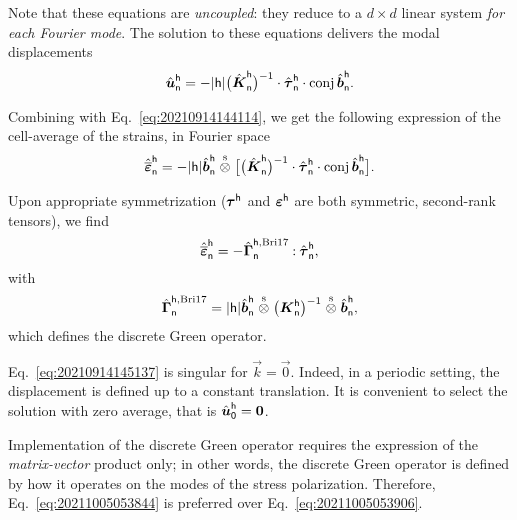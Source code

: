 Note that these equations are \emph{uncoupled}: they reduce to a \(d\times d\)
linear system \emph{for each Fourier mode}. The solution to these equations
delivers the modal displacements
\begin{equation}
  \hat{\boldsymbol u}_\mathsf{n}^\mathsf{h}=-\lvert\mathsf{h}\rvert\bigl(
  \hat{\boldsymbol K}_\mathsf{n}^\mathsf{h}\bigr)^{-1}\cdot
  \hat{\boldsymbol\tau}_\mathsf{n}^\mathsf{h}\cdot\operatorname{conj}\hat{\boldsymbol b}_\mathsf{n}^\mathsf{h}.
\end{equation}

Combining with Eq.~\eqref{eq:20210914144114}, we get the following expression of
the cell-average of the strains, in Fourier space
\begin{equation}
  \label{eq:20211005053844}
  \hat{\overline{\boldsymbol\varepsilon}}_\mathsf{n}^\mathsf{h}=-\lvert\mathsf{h}\rvert
  \hat{\boldsymbol b}_\mathsf{n}^\mathsf{h}\stackrel{\mathrm{s}}{\otimes}\bigl[\bigl(
  \hat{\boldsymbol K}_\mathsf{n}^\mathsf{h}\bigr)^{-1}\cdot
  \hat{\boldsymbol\tau}_\mathsf{n}^\mathsf{h}\cdot\operatorname{conj}\hat{\boldsymbol b}_\mathsf{n}^\mathsf{h}
  \bigr].
\end{equation}

Upon appropriate symmetrization (\(\boldsymbol\tau^\mathsf{h}\) and
\(\boldsymbol\varepsilon^\mathsf{h}\) are both symmetric, second-rank tensors), we find
\begin{equation}
  \hat{\overline{\boldsymbol\varepsilon}}_\mathsf{n}^\mathsf{h}
  =-\hat{\boldsymbol\Gamma}_\mathsf{n}^{\mathsf{h}, \text{Bri17}}\mathbin{\mathord{:}}
  \hat{\boldsymbol\tau}_\mathsf{n}^\mathsf{h},
\end{equation}
with
\begin{equation}
  \label{eq:20211005053906}
  \hat{\boldsymbol\Gamma}_\mathsf{n}^{\mathsf{h}, \text{Bri17}}=\lvert\mathsf{h}\rvert
  \hat{\boldsymbol b}_\mathsf{n}^\mathsf{h}\stackrel{\mathrm{s}}{\otimes}\bigl(\boldsymbol K_\mathsf{n}^\mathsf{h}
  \bigr)^{-1}\stackrel{\mathrm{s}}{\otimes}\hat{\boldsymbol b}_\mathsf{n}^\mathsf{h},
\end{equation}
which defines the discrete Green operator. 

\begin{remark}
  Eq.~\eqref{eq:20210914145137} is singular for \(\vec k = \vec 0\). Indeed, in
  a periodic setting, the displacement is defined up to a constant translation.
  It is convenient to select the solution with zero average, that is
  \(\hat{\boldsymbol u}_\mathsf{0}^\mathsf{h}=\boldsymbol 0\).
\end{remark}

\begin{remark}
  Implementation of the discrete Green operator requires the expression of the
  \emph{matrix-vector} product only; in other words, the discrete Green operator
  is defined by how it operates on the modes of the stress
  polarization. Therefore, Eq.~\eqref{eq:20211005053844} is preferred over
  Eq.~\eqref{eq:20211005053906}.
\end{remark}

